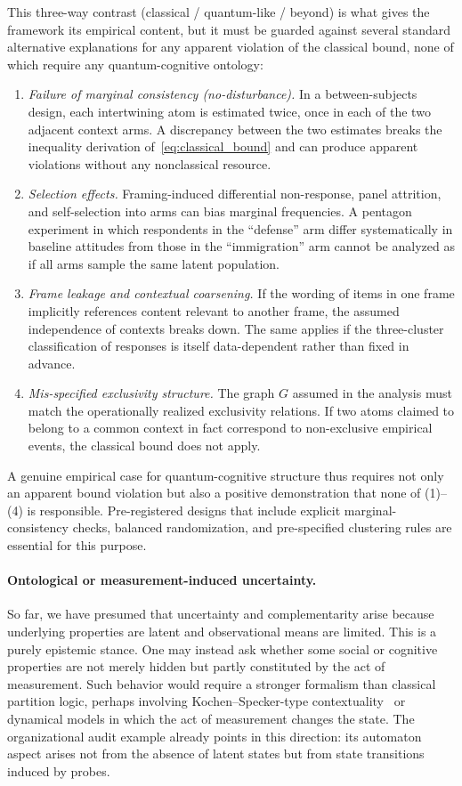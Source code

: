 \documentclass{article}
\begin{document}
This three-way contrast (classical / quantum-like / beyond) is what
gives the framework its empirical content, but it must be guarded
against several standard alternative explanations for any apparent
violation of the classical bound, none of which require any
quantum-cognitive ontology:
\begin{enumerate}
\item \emph{Failure of marginal consistency (no-disturbance).}
In a between-subjects design, each intertwining atom is estimated
twice, once in each of the two adjacent context arms. A discrepancy
between the two estimates breaks the inequality derivation
of~\eqref{eq:classical_bound} and can produce apparent violations
without any nonclassical resource.
\item \emph{Selection effects.}
Framing-induced differential non-response, panel attrition, and
self-selection into arms can bias marginal frequencies. A pentagon
experiment in which respondents in the ``defense'' arm differ
systematically in baseline attitudes from those in the
``immigration'' arm cannot be analyzed as if all arms sample the
same latent population.
\item \emph{Frame leakage and contextual coarsening.}
If the wording of items in one frame implicitly references content
relevant to another frame, the assumed independence of contexts
breaks down. The same applies if the three-cluster classification of
responses is itself data-dependent rather than fixed in advance.
\item \emph{Mis-specified exclusivity structure.}
The graph $G$ assumed in the analysis must match the operationally
realized exclusivity relations. If two atoms claimed to belong to a
common context in fact correspond to non-exclusive empirical
events, the classical bound does not apply.
\end{enumerate}
A genuine empirical case for quantum-cognitive structure thus
requires not only an apparent bound violation but also a positive
demonstration that none of (1)--(4) is responsible. Pre-registered
designs that include explicit marginal-consistency checks, balanced
randomization, and pre-specified clustering rules are essential for
this purpose.

\paragraph{Ontological or measurement-induced uncertainty.}
So far, we have presumed that uncertainty and complementarity arise
because underlying properties are latent and observational means are
limited. This is a purely epistemic stance. One may instead ask
whether some social or cognitive properties are not merely hidden but
partly constituted by the act of measurement. Such behavior would
require a stronger formalism than classical partition logic, perhaps
involving Kochen--Specker-type contextuality~\cite{kochen1} or
dynamical models in which the act of measurement changes the state.
The organizational audit example already points in this direction:
its automaton aspect arises not from the absence of latent states but
from state transitions induced by probes.
\end{document}
